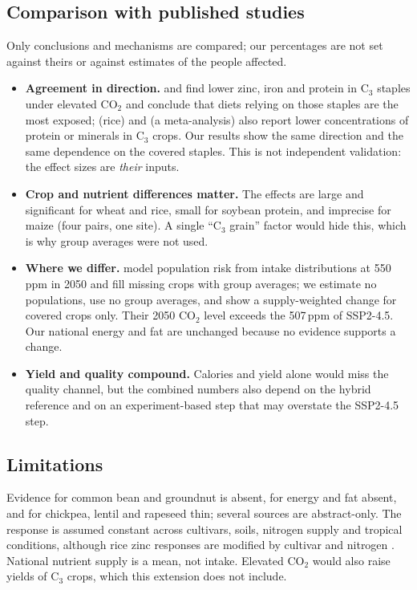 \begin{table}[H]\centering\scriptsize
\caption[National zinc, iron and protein changes]{National changes (\%) in the 20 panel countries. A: climate yield
loss only; B: CO$_2$ quality only; C: combined (hybrid reference, primary set). $\Delta$MAR in points.}\label{tab:co2countries}
\end{table}

\subsection{Comparison with published studies}
Only conclusions and mechanisms are compared; our percentages are not set against theirs or against estimates of the
people affected.
\begin{itemize}
\item \textbf{Agreement in direction.} \citet{myers2014} and \citet{smith2018} find lower zinc, iron and protein in
C$_3$ staples under elevated CO$_2$ and conclude that diets relying on those staples are the most exposed;
\citet{zhu2018} (rice) and \citet{loladze2014} (a meta-analysis) also report lower concentrations of protein or minerals
in C$_3$ crops. Our results show the same direction and the same dependence on the covered staples. This is not
independent validation: the effect sizes are \emph{their} inputs.
\item \textbf{Crop and nutrient differences matter.} The effects are large and significant for wheat and rice, small
for soybean protein, and imprecise for maize (four pairs, one site). A single ``C$_3$ grain'' factor would hide this,
which is why group averages were not used.
\item \textbf{Where we differ.} \citet{smith2018} model population risk from intake distributions at 550\,ppm in 2050 and
fill missing crops with group averages; we estimate no populations, use no group averages, and show a supply-weighted
change for covered crops only. Their 2050 CO$_2$ level exceeds the 507\,ppm of SSP2-4.5. Our national energy and fat
are unchanged because no evidence supports a change.
\item \textbf{Yield and quality compound.} Calories and yield alone would miss the quality channel, but the combined
numbers also depend on the hybrid reference and on an experiment-based step that may overstate the SSP2-4.5 step.
\end{itemize}

\subsection{Limitations}
Evidence for common bean and groundnut is absent, for energy and fat absent, and for chickpea, lentil and rapeseed
thin; several sources are abstract-only. The response is assumed constant across cultivars, soils, nitrogen supply and
tropical conditions, although rice zinc responses are modified by cultivar and nitrogen \citep{myers2014}. National
nutrient supply is a mean, not intake. Elevated CO$_2$ would also raise yields of C$_3$ crops, which this extension does not
include.

